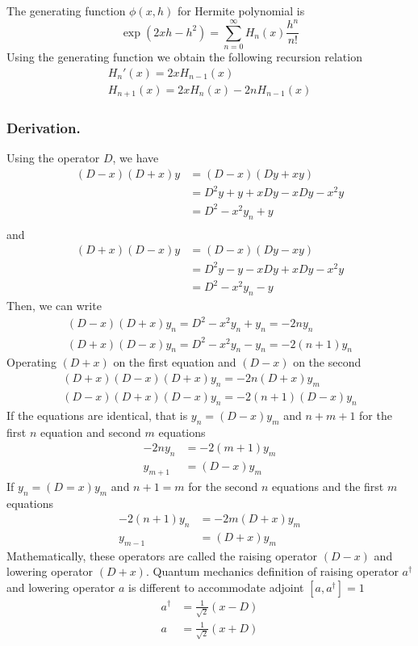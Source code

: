 \documentclass[../../../main.tex]{subfiles}
\begin{document}
The generating function $\phi(x,h)$ for Hermite polynomial is 
\begin{equation*}
    \exp(2xh-h^2)=\sum_{n=0}^{\infty}H_n(x)\frac{h^n}{n!}
\end{equation*}
Using the generating function we obtain the following recursion relation
\begin{gather*}
    H_n'(x)=2xH_{n-1}(x)\\
    H_{n+1}(x)=2xH_{n}(x)-2nH_{n-1}(x)
\end{gather*}

\subsubsection{Derivation.} Using the operator $D$, we have
\begin{align*}
    (D-x)(D+x)y & =(D-x)(Dy+xy)        \\
                & =D^2y+y+xDy-xDy-x^2y \\
                & =D^2-x^2y_n+y        \\
\end{align*}
and
\begin{align*}
    (D+x)(D-x)y & =(D-x)(Dy-xy)        \\
                & =D^2y-y-xDy+xDy-x^2y \\
                & =D^2-x^2y_n-y
\end{align*}
Then, we can write
\begin{gather*}
    (D-x)(D+x)y_n=D^2-x^2y_n+y_n=-2ny_n\\
    (D+x)(D-x)y_n=D^2-x^2y_n-y_n=-2(n+1)y_n
\end{gather*}
Operating $(D+x)$ on the first equation and $(D-x)$ on the second
\begin{align*}
    (D+x)(D-x)(D+x)y_n=-2n(D+x)y_m \\
    (D-x)(D+x)(D-x)y_n=-2(n+1)(D-x)y_n
\end{align*}
If the equations are identical, that is $y_n=(D-x)y_m$ and $n+m+1$ for the first $n$ equation and second $m$ equations
\begin{align*}
    -2ny_n  & =-2(m+1)y_m \\
    y_{m+1} & =(D-x)y_m
\end{align*}
If $y_n=(D=x)y_m$ and $n+1=m$ for the second $n$ equations and the first $m$ equations
\begin{align*}
    -2(n+1)y_n & =-2m(D+x)y_m \\
    y_{m-1}    & =(D+x)y_m
\end{align*}
Mathematically, these operators are called the raising operator $(D-x)$ and lowering operator $(D+x)$.
Quantum mechanics definition of raising operator $a^\dagger$ and lowering operator $a$ is different to accommodate adjoint $[a,a^\dagger]=1$
\begin{align*}
    a^\dagger&=\frac{1}{\sqrt{2}}(x-D)\\
    a&=\frac{1}{\sqrt{2}}(x+D)
\end{align*}
\end{document}
